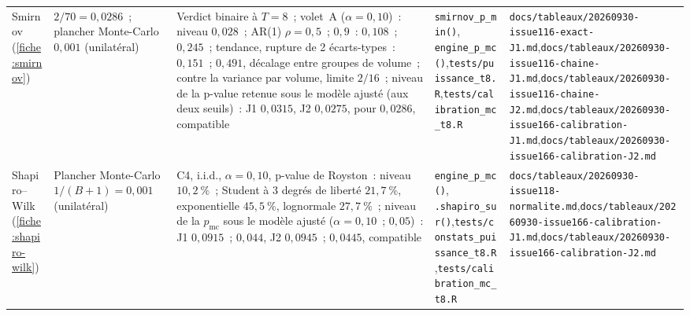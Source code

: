 \documentclass[a4paper,11pt]{article}
\newcommand{\code}[1]{\texttt{\small #1}}
\begin{document}
\begin{landscape}
\begin{center}
\begin{longtable}{@{}>{\raggedright\arraybackslash}p{2.5cm}>{\raggedright\arraybackslash}p{3.6cm}>{\raggedright\arraybackslash}p{4.0cm}>{\raggedright\arraybackslash}p{6.7cm}>{\raggedright\arraybackslash}p{7.2cm}@{}}
Smirnov (\ref{fiche:smirnov}) & $2/70 = 0{,}0286$~; plancher Monte-Carlo $0{,}001$ (unilatéral) & Verdict binaire à $T = 8$~; volet~A ($\alpha = 0{,}10$)~: niveau $0{,}028$~; AR(1) $\rho = 0{,}5$~; $0{,}9$~: $0{,}108$~; $0{,}245$~; tendance, rupture de 2 écarts-types~: $0{,}151$~; $0{,}491$, décalage entre groupes de volume~; contre la variance par volume, limite $2/16$~; niveau de la p-value retenue sous le modèle ajusté (aux deux seuils)~: J1 $0{,}0315$, J2 $0{,}0275$, pour $0{,}0286$, compatible & \code{smirnov\_p\_min()}, \code{engine\_p\_mc()},\newline \code{tests/puissance\_t8.R},\newline \code{tests/calibration\_mc\_t8.R} & \code{docs/tableaux/}\newline \code{20260930-issue116-exact-J1.md},\newline \code{docs/tableaux/}\newline \code{20260930-issue116-chaine-J1.md},\newline \code{docs/tableaux/}\newline \code{20260930-issue116-chaine-J2.md},\newline \code{docs/tableaux/}\newline \code{20260930-issue166-calibration-J1.md},\newline \code{docs/tableaux/}\newline \code{20260930-issue166-calibration-J2.md} \\
Shapiro--Wilk (\ref{fiche:shapiro-wilk}) & Plancher Monte-Carlo $1/(B+1) = 0{,}001$ (unilatéral) & C4, i.i.d., $\alpha = 0{,}10$, p-value de Royston~: niveau $10{,}2~\%$~; Student à 3 degrés de liberté $21{,}7~\%$, exponentielle $45{,}5~\%$, lognormale $27{,}7~\%$~; niveau de la $p_{\mathrm{mc}}$ sous le modèle ajusté ($\alpha = 0{,}10$~; $0{,}05$)~: J1 $0{,}0915$~; $0{,}044$, J2 $0{,}0945$~; $0{,}0445$, compatible & \code{engine\_p\_mc()}, \code{.shapiro\_sur()},\newline \code{tests/constats\_puissance\_t8.R},\newline \code{tests/calibration\_mc\_t8.R} & \code{docs/tableaux/}\newline \code{20260930-issue118-normalite.md},\newline \code{docs/tableaux/}\newline \code{20260930-issue166-calibration-J1.md},\newline \code{docs/tableaux/}\newline \code{20260930-issue166-calibration-J2.md} \\

\end{longtable}
\end{center}
\end{landscape}
\end{document}
